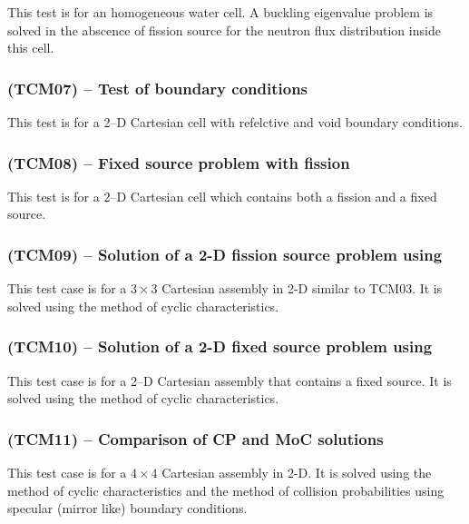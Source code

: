 This test is for an homogeneous water cell. A buckling eigenvalue problem is
solved in the abscence of fission source for the neutron flux distribution
inside this cell.


\subsubsection{\tst(TCM07) -- Test of boundary conditions}

This test is for a 2--D Cartesian cell with refelctive and void boundary
conditions.


\subsubsection{\tst(TCM08) -- Fixed source problem with fission}

This test is for a 2--D Cartesian cell which contains both a fission and a
fixed source.

 
\subsubsection{\tst(TCM09) -- Solution of a 2-D fission source problem using }\label{sect:ExTCM09}

This test case is for a $3\times 3$ Cartesian assembly in 2-D similar to TCM03. It is
solved using the method of cyclic characteristics.


\subsubsection{\tst(TCM10) -- Solution of a 2-D fixed source problem using }\label{sect:ExTCM10}

This test case is for a 2--D Cartesian assembly that contains a fixed source. It is solved
using the method of cyclic characteristics.


\subsubsection{\tst(TCM11) -- Comparison of CP and MoC solutions}\label{sect:ExTCM11}

This test case is for a $4\times 4$ Cartesian assembly in 2-D. It is solved using the
method of cyclic characteristics and the method of collision probabilities using specular
(mirror like) boundary conditions.

